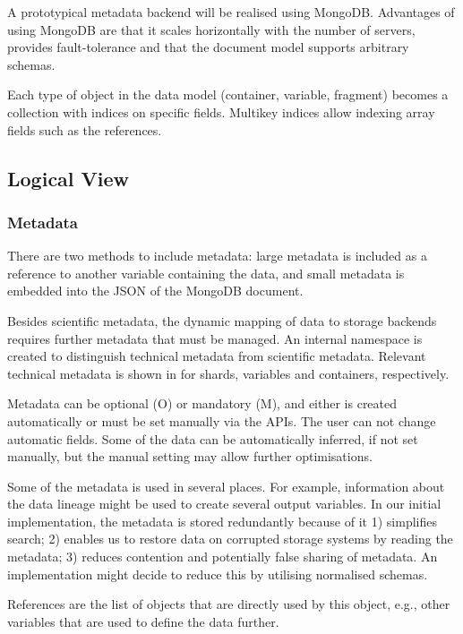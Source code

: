 
A prototypical metadata backend will be realised using MongoDB.
Advantages of using MongoDB are that it scales horizontally with the number of servers, provides fault-tolerance and that the document model supports arbitrary schemas.


Each type of object in the data model (container, variable, fragment) becomes a collection with indices on specific fields.
Multikey indices allow indexing array fields such as the references.



\subsection{Logical View}
\label{backend: mongo/logical}

\subsubsection{Metadata}

There are two methods to include metadata: large metadata is included as a reference to another variable containing the data, and small metadata is embedded into the JSON of the MongoDB document.

Besides scientific metadata, the dynamic mapping of data to storage backends requires further metadata that must be managed.
An internal namespace is created to distinguish technical metadata from scientific metadata.
Relevant technical metadata is shown in  for shards, variables and containers, respectively.

Metadata can be optional (O) or mandatory (M), and either is created automatically or must be set manually via the APIs.
The user can not change automatic fields.
Some of the data can be automatically inferred, if not set manually, but the manual setting may allow further optimisations.

Some of the metadata is used in several places. For example, information about the data lineage might be used to create several output variables.
In our initial implementation, the metadata is stored redundantly because of it
1) simplifies search; 2) enables us to restore data on corrupted storage systems by reading the metadata; 3) reduces contention and potentially false sharing of metadata.
An implementation might decide to reduce this by utilising normalised schemas.

References are the list of objects that are directly used by this object, e.g., other variables that are used to define the data further.

